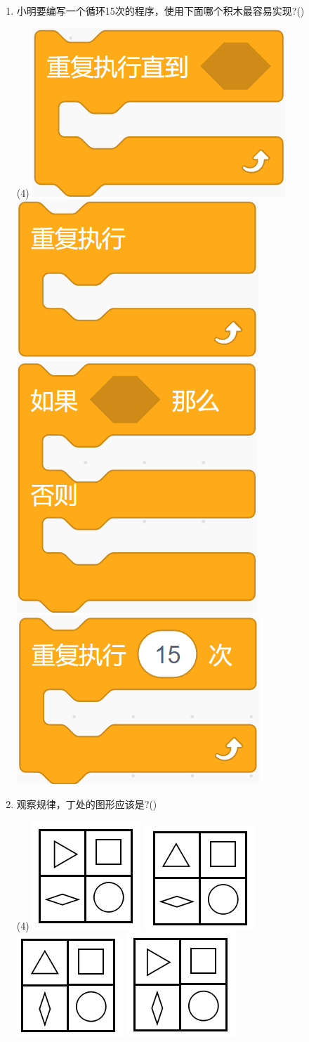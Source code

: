 \documentclass[10pt, a4paper]{article}
\begin{document}
\begin{enumerate}
        \item 小明要编写一个循环15次的程序，使用下面哪个积木最容易实现?(\qquad)
        \begin{tasks}(4)
            \task \includegraphics[width=.15\textwidth]{13a.png}
            \task \includegraphics[width=.15\textwidth]{13b.png}
            \task \includegraphics[width=.1\textwidth]{13c.png}
            \task \includegraphics[width=.15\textwidth]{13d.png}
        \end{tasks}

        \item 观察规律，丁处的图形应该是?(\qquad)
        \begin{tasks}(4)
            \task \includegraphics[width=.1\textwidth]{14a.png}
            \task \includegraphics[width=.1\textwidth]{14b.png}
            \task \includegraphics[width=.1\textwidth]{14c.png}
            \task \includegraphics[width=.1\textwidth]{14d.png}
        \end{tasks}


\end{enumerate}
\end{document}
